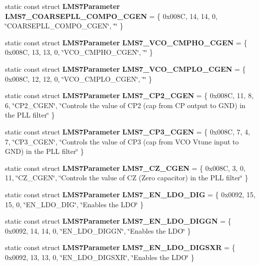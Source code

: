 \begin{DoxyCompactItemize}
\item 
static const struct {\bf L\+M\+S7\+Parameter} {\bf L\+M\+S7\+\_\+\+C\+O\+A\+R\+S\+E\+P\+L\+L\+\_\+\+C\+O\+M\+P\+O\+\_\+\+C\+G\+EN} = \{ 0x008\+C, 14, 14, 0, \char`\"{}\+C\+O\+A\+R\+S\+E\+P\+L\+L\+\_\+\+C\+O\+M\+P\+O\+\_\+\+C\+G\+E\+N\char`\"{}, \char`\"{}\char`\"{} \}
\item 
static const struct {\bf L\+M\+S7\+Parameter} {\bf L\+M\+S7\+\_\+\+V\+C\+O\+\_\+\+C\+M\+P\+H\+O\+\_\+\+C\+G\+EN} = \{ 0x008\+C, 13, 13, 0, \char`\"{}\+V\+C\+O\+\_\+\+C\+M\+P\+H\+O\+\_\+\+C\+G\+E\+N\char`\"{}, \char`\"{}\char`\"{} \}
\item 
static const struct {\bf L\+M\+S7\+Parameter} {\bf L\+M\+S7\+\_\+\+V\+C\+O\+\_\+\+C\+M\+P\+L\+O\+\_\+\+C\+G\+EN} = \{ 0x008\+C, 12, 12, 0, \char`\"{}\+V\+C\+O\+\_\+\+C\+M\+P\+L\+O\+\_\+\+C\+G\+E\+N\char`\"{}, \char`\"{}\char`\"{} \}
\item 
static const struct {\bf L\+M\+S7\+Parameter} {\bf L\+M\+S7\+\_\+\+C\+P2\+\_\+\+C\+G\+EN} = \{ 0x008\+C, 11, 8, 6, \char`\"{}\+C\+P2\+\_\+\+C\+G\+E\+N\char`\"{}, \char`\"{}\+Controls the value of C\+P2 (cap from C\+P output to G\+N\+D) in the P\+L\+L filter\char`\"{} \}
\item 
static const struct {\bf L\+M\+S7\+Parameter} {\bf L\+M\+S7\+\_\+\+C\+P3\+\_\+\+C\+G\+EN} = \{ 0x008\+C, 7, 4, 7, \char`\"{}\+C\+P3\+\_\+\+C\+G\+E\+N\char`\"{}, \char`\"{}\+Controls the value of C\+P3 (cap from V\+C\+O Vtune input to G\+N\+D) in the P\+L\+L filter\char`\"{} \}
\item 
static const struct {\bf L\+M\+S7\+Parameter} {\bf L\+M\+S7\+\_\+\+C\+Z\+\_\+\+C\+G\+EN} = \{ 0x008\+C, 3, 0, 11, \char`\"{}\+C\+Z\+\_\+\+C\+G\+E\+N\char`\"{}, \char`\"{}\+Controls the value of C\+Z (\+Zero capacitor) in the P\+L\+L filter\char`\"{} \}
\item 
static const struct {\bf L\+M\+S7\+Parameter} {\bf L\+M\+S7\+\_\+\+E\+N\+\_\+\+L\+D\+O\+\_\+\+D\+IG} = \{ 0x0092, 15, 15, 0, \char`\"{}\+E\+N\+\_\+\+L\+D\+O\+\_\+\+D\+I\+G\char`\"{}, \char`\"{}\+Enables the L\+D\+O\char`\"{} \}
\item 
static const struct {\bf L\+M\+S7\+Parameter} {\bf L\+M\+S7\+\_\+\+E\+N\+\_\+\+L\+D\+O\+\_\+\+D\+I\+G\+GN} = \{ 0x0092, 14, 14, 0, \char`\"{}\+E\+N\+\_\+\+L\+D\+O\+\_\+\+D\+I\+G\+G\+N\char`\"{}, \char`\"{}\+Enables the L\+D\+O\char`\"{} \}
\item 
static const struct {\bf L\+M\+S7\+Parameter} {\bf L\+M\+S7\+\_\+\+E\+N\+\_\+\+L\+D\+O\+\_\+\+D\+I\+G\+S\+XR} = \{ 0x0092, 13, 13, 0, \char`\"{}\+E\+N\+\_\+\+L\+D\+O\+\_\+\+D\+I\+G\+S\+X\+R\char`\"{}, \char`\"{}\+Enables the L\+D\+O\char`\"{} \}

\end{DoxyCompactItemize}
